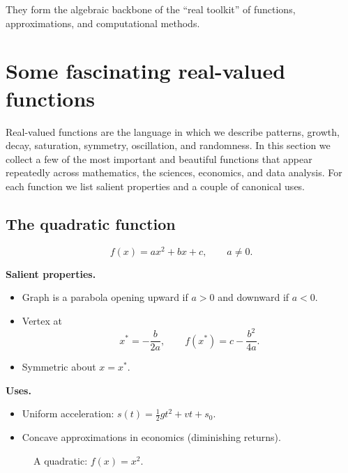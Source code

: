 They form the algebraic backbone of the ``real toolkit'' of functions,
approximations, and computational methods.

\section{Some fascinating real-valued functions}

Real-valued functions are the language in which we describe patterns, growth,
decay, saturation, symmetry, oscillation, and randomness.  In this section we
collect a few of the most important and beautiful functions that appear
repeatedly across mathematics, the sciences, economics, and data analysis.
For each function we list salient properties and a couple of canonical uses.

\medskip

\subsection{The quadratic function}

\[
f(x)=ax^2+bx+c,\qquad a\neq 0.
\]

\textbf{Salient properties.}
\begin{itemize}
\item Graph is a parabola opening upward if $a>0$ and downward if $a<0$.
\item Vertex at 
\[
x^*=-\frac{b}{2a},\qquad f(x^*)=c-\frac{b^2}{4a}.
\]
\item Symmetric about $x=x^*$.
\end{itemize}

\textbf{Uses.}
\begin{itemize}
\item Uniform acceleration: $s(t)=\tfrac12gt^2+vt+s_0$.
\item Concave approximations in economics (diminishing returns).
\end{itemize}

\begin{figure}[h]
\centering
{}
\caption{A quadratic: $f(x)=x^2$.}
\end{figure}

